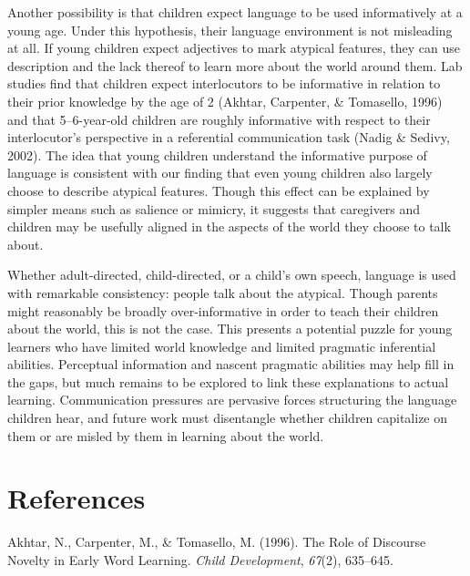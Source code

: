 \documentclass[10pt, letterpaper]{article}
\begin{document}
Another possibility is that children expect language to be used
informatively at a young age. Under this hypothesis, their language
environment is not misleading at all. If young children expect
adjectives to mark atypical features, they can use description and the
lack thereof to learn more about the world around them. Lab studies find
that children expect interlocutors to be informative in relation to
their prior knowledge by the age of 2 (Akhtar, Carpenter, \& Tomasello,
1996) and that 5--6-year-old children are roughly informative with
respect to their interlocutor's perspective in a referential
communication task (Nadig \& Sedivy, 2002). The idea that young children
understand the informative purpose of language is consistent with our
finding that even young children also largely choose to describe
atypical features. Though this effect can be explained by simpler means
such as salience or mimicry, it suggests that caregivers and children
may be usefully aligned in the aspects of the world they choose to talk
about.

Whether adult-directed, child-directed, or a child's own speech,
language is used with remarkable consistency: people talk about the
atypical. Though parents might reasonably be broadly over-informative in
order to teach their children about the world, this is not the case.
This presents a potential puzzle for young learners who have limited
world knowledge and limited pragmatic inferential abilities. Perceptual
information and nascent pragmatic abilities may help fill in the gaps,
but much remains to be explored to link these explanations to actual
learning. Communication pressures are pervasive forces structuring the
language children hear, and future work must disentangle whether
children capitalize on them or are misled by them in learning about the
world.

\vspace{1em} 

\hypertarget{references}{%
\section{References}\label{references}}

\setlength{\parindent}{-0.1in} 
\setlength{\leftskip}{0.125in}

\noindent

\hypertarget{refs}{}
\leavevmode\hypertarget{ref-akhtar1996}{}%
Akhtar, N., Carpenter, M., \& Tomasello, M. (1996). The Role of
Discourse Novelty in Early Word Learning. \emph{Child Development},
\emph{67}(2), 635--645.
\end{document}
